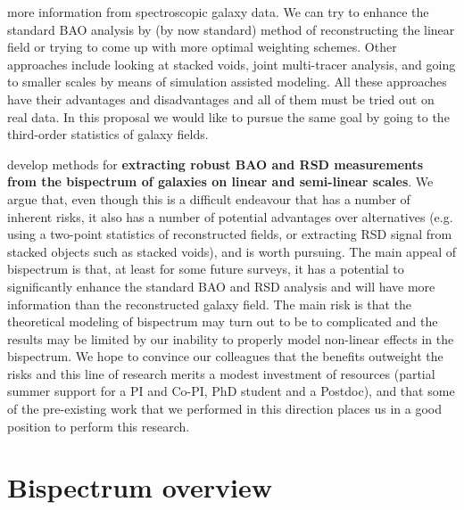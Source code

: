 more information from spectroscopic galaxy data. We can try to enhance the
standard BAO analysis by (by now standard) method of reconstructing the linear
field or trying to come up with more optimal weighting schemes. Other
approaches include looking at stacked voids, joint multi-tracer analysis, and
going to smaller scales by means of simulation assisted modeling. All these
approaches have their advantages and disadvantages and all of them must be
tried out on real data. In this proposal we would like to pursue the same goal
by going to the third-order statistics of galaxy fields.

develop methods for \textbf{extracting robust BAO and RSD measurements from
the  bispectrum of galaxies on linear and semi-linear scales}. We argue that,
even though this is a difficult  endeavour that has a number of inherent
risks, it also has a number of potential advantages over alternatives (e.g.
using a two-point statistics of reconstructed fields, or extracting RSD signal
from stacked objects such as stacked voids), and is worth pursuing. The main
appeal of bispectrum is that, at least for some future surveys, it has a
potential to significantly enhance the standard BAO and RSD analysis and will
have more information than the reconstructed galaxy field. The main risk is
that the theoretical modeling of bispectrum may turn out to be to complicated
and the results may be limited by our inability to properly model non-linear
effects in the bispectrum. We hope to convince our colleagues that the
benefits  outweight the risks and this line of research merits a modest
investment of resources (partial summer support for a PI and Co-PI, PhD
student and a Postdoc), and that some of the pre-existing work that we
performed in this direction places us in a good position  to perform this
research. %

\section{Bispectrum overview}

